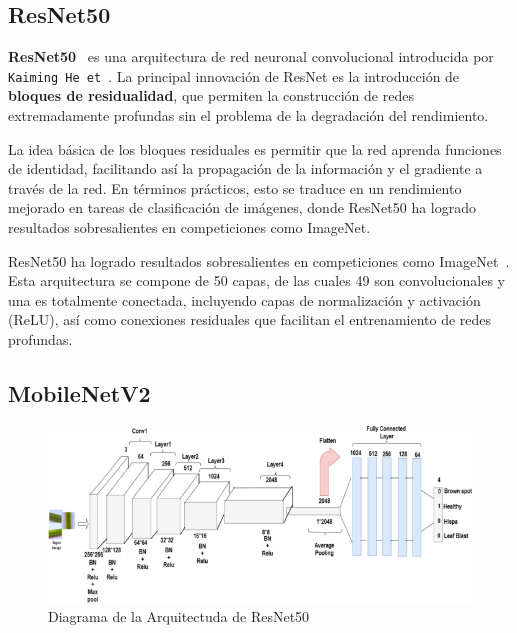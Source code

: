 \subsection{ResNet50}\label{subsec:resnet50}
\textbf{ResNet50}~\cite{ResNet50} es una arquitectura de red neuronal convolucional introducida por
\texttt{Kaiming He et}~\cite{heDeepResidualLearning2016}.
La principal innovación de ResNet es la introducción de \textbf{bloques de residualidad}, que permiten la construcción
de redes extremadamente profundas sin el problema de la degradación del rendimiento.


La idea básica de los bloques residuales es permitir que la red aprenda funciones de identidad, facilitando así la
propagación de la información y el gradiente a través de la red.
En términos prácticos, esto se traduce en un rendimiento mejorado en tareas de clasificación de imágenes, donde
ResNet50 ha logrado resultados sobresalientes en competiciones como ImageNet.


ResNet50 ha logrado resultados sobresalientes en competiciones como ImageNet~\cite{alnuaimHumanComputerInteractionHand2022}.
Esta arquitectura se compone de 50 capas, de las cuales 49 son convolucionales y una es totalmente conectada,
incluyendo capas de normalización y activación (ReLU), así como conexiones residuales que facilitan el entrenamiento de
redes profundas.

\subsection{MobileNetV2}\label{subsec:mobilenet}

\begin{figure}[htp] \label{fig:resnet50}
    \begin{center}
        \includegraphics[width=1\textwidth]{imagenes/resnet50}
    \end{center}
    \caption[ResNet50]{Diagrama de la Arquitectuda de ResNet50}
\end{figure}

